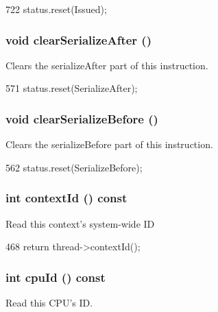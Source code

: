 \begin{DoxyCode}
722 { status.reset(Issued); }
\end{DoxyCode}
\hypertarget{classBaseDynInst_abe42baa87e7660df60248deec78f8d5a}{
\subsubsection[{clearSerializeAfter}]{\setlength{\rightskip}{0pt plus 5cm}void clearSerializeAfter ()}}
\label{classBaseDynInst_abe42baa87e7660df60248deec78f8d5a}
Clears the serializeAfter part of this instruction. 


\begin{DoxyCode}
571 { status.reset(SerializeAfter); }
\end{DoxyCode}
\hypertarget{classBaseDynInst_a09b692cf6e7b00c1160248452fa24d4b}{
\subsubsection[{clearSerializeBefore}]{\setlength{\rightskip}{0pt plus 5cm}void clearSerializeBefore ()}}
\label{classBaseDynInst_a09b692cf6e7b00c1160248452fa24d4b}
Clears the serializeBefore part of this instruction. 


\begin{DoxyCode}
562 { status.reset(SerializeBefore); }
\end{DoxyCode}
\hypertarget{classBaseDynInst_a651d5d14e7a4e95ebe6d7f5b8ee5a107}{
\subsubsection[{contextId}]{\setlength{\rightskip}{0pt plus 5cm}int contextId () const}}
\label{classBaseDynInst_a651d5d14e7a4e95ebe6d7f5b8ee5a107}
Read this context's system-\/wide ID 


\begin{DoxyCode}
468 { return thread->contextId(); }
\end{DoxyCode}
\hypertarget{classBaseDynInst_a1e2d18ebf4e21f2416c21a8b072e2c7b}{
\subsubsection[{cpuId}]{\setlength{\rightskip}{0pt plus 5cm}int cpuId () const}}
\label{classBaseDynInst_a1e2d18ebf4e21f2416c21a8b072e2c7b}
Read this CPU's ID. 


